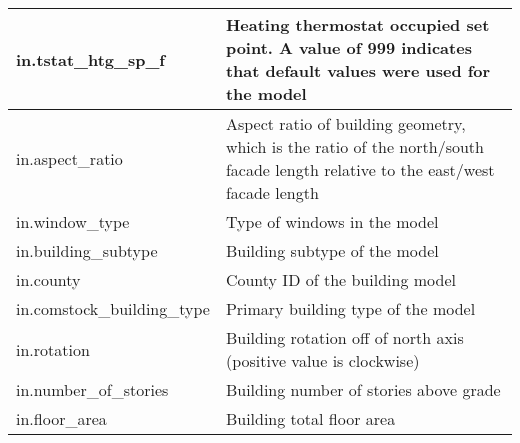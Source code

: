 \begin{center}
\begin{longtable}{|p{3in}|p{3in}|}
in.tstat\_htg\_sp\_f                                                             & Heating thermostat occupied set point. A value of 999 indicates that default values were used for the model                                                                  \\ \hline
in.aspect\_ratio                                                                 & Aspect ratio of building geometry, which is the ratio of the north/south facade length relative to the east/west facade length                                                \\ \hline
in.window\_type                                                                  & Type of windows in the model                                                                                                                                         \\ \hline
in.building\_subtype                                                             & Building subtype of the model                                                                                                                                            \\ \hline
in.county                                                                        & County ID of the building model                                                                                                                                          \\ \hline
in.comstock\_building\_type                                                      & Primary building type of the model                                                                                                                                       \\ \hline
in.rotation                                                                      & Building rotation off of north axis (positive value is clockwise)                                                                                                    \\ \hline
in.number\_of\_stories                                                           & Building number of stories above grade                                                                                                                               \\ \hline
in.floor\_area                                                                   & Building total floor area                                                                                                                                            \\ \hline

\end{longtable}
\end{center}
